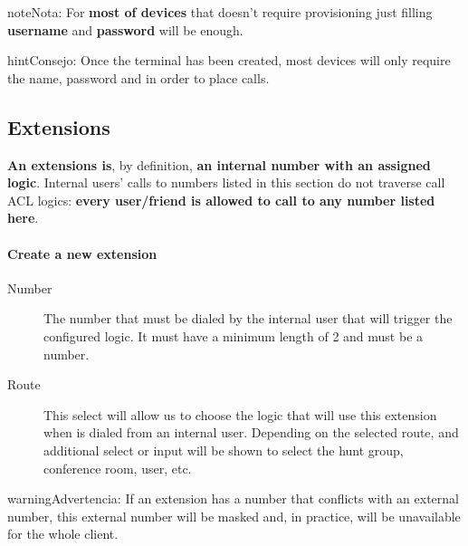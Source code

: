 \documentclass[letterpaper,10pt,spanish]{sphinxmanual}
\begin{document}
\begin{notice}{note}{Nota:}
For \textbf{most of devices} that doesn't require provisioning just
filling \textbf{username} and \textbf{password} will be enough.
\end{notice}

\begin{notice}{hint}{Consejo:}
Once the terminal has been created, most devices will only
require the name, password and {\hyperref[getting_started/internal_calls/brand_portal:domain\string-per\string-client]{}}
in order to place calls.
\end{notice}


\subsection{Extensions}
\label{administration_portal/client/vpbx/extensions:extensions}\label{administration_portal/client/vpbx/extensions::doc}\label{administration_portal/client/vpbx/extensions:id1}
\textbf{An extensions is}, by definition, \textbf{an internal number with an assigned
logic}. Internal users' calls to numbers listed in this section do not traverse
call ACL logics: \textbf{every user/friend is allowed to call to any number listed here}.
\paragraph{Create a new extension}
\begin{description}
\item[{Number}] \leavevmode
The number that must be dialed by the internal user that will trigger
the configured logic. It must have a minimum length of 2 and must be
a number.

\item[{Route}] \leavevmode
This select will allow us to choose the logic that will use this
extension when is dialed from an internal user. Depending on the selected
route, and additional select or input will be shown to select the
hunt group, conference room, user, etc.

\end{description}

\begin{notice}{warning}{Advertencia:}
If an extension has a number that conflicts with an external
number, this external number will be masked and, in practice, will be
unavailable for the whole client.
\end{notice}
\end{document}
